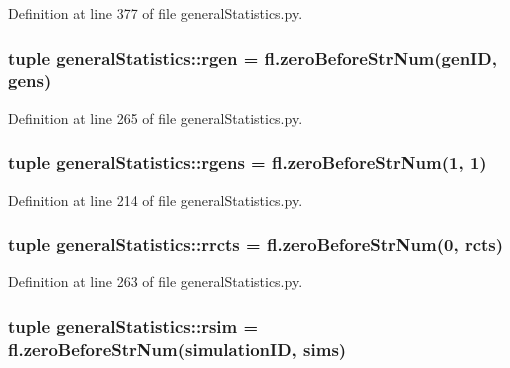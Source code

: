 \-Definition at line 377 of file general\-Statistics.\-py.

\hypertarget{namespacegeneral_statistics_a9f0e3da38cc8d932786debb2d495a13b}{
\subsubsection[{rgen}]{\setlength{\rightskip}{0pt plus 5cm}tuple {\bf general\-Statistics\-::rgen} = fl.\-zero\-Before\-Str\-Num(gen\-I\-D, {\bf gens})}}\label{namespacegeneral_statistics_a9f0e3da38cc8d932786debb2d495a13b}


\-Definition at line 265 of file general\-Statistics.\-py.

\hypertarget{namespacegeneral_statistics_aae4999d25c34936e487c12f7b967e638}{
\subsubsection[{rgens}]{\setlength{\rightskip}{0pt plus 5cm}tuple {\bf general\-Statistics\-::rgens} = fl.\-zero\-Before\-Str\-Num(1, 1)}}\label{namespacegeneral_statistics_aae4999d25c34936e487c12f7b967e638}


\-Definition at line 214 of file general\-Statistics.\-py.

\hypertarget{namespacegeneral_statistics_a6cf3e4aec08e23edc7453e9dc795360e}{
\subsubsection[{rrcts}]{\setlength{\rightskip}{0pt plus 5cm}tuple {\bf general\-Statistics\-::rrcts} = fl.\-zero\-Before\-Str\-Num(0, {\bf rcts})}}\label{namespacegeneral_statistics_a6cf3e4aec08e23edc7453e9dc795360e}


\-Definition at line 263 of file general\-Statistics.\-py.

\hypertarget{namespacegeneral_statistics_a2dfa50767faeb2e6493518af2b17dec0}{
\subsubsection[{rsim}]{\setlength{\rightskip}{0pt plus 5cm}tuple {\bf general\-Statistics\-::rsim} = fl.\-zero\-Before\-Str\-Num({\bf simulation\-I\-D}, {\bf sims})}}\label{namespacegeneral_statistics_a2dfa50767faeb2e6493518af2b17dec0}


